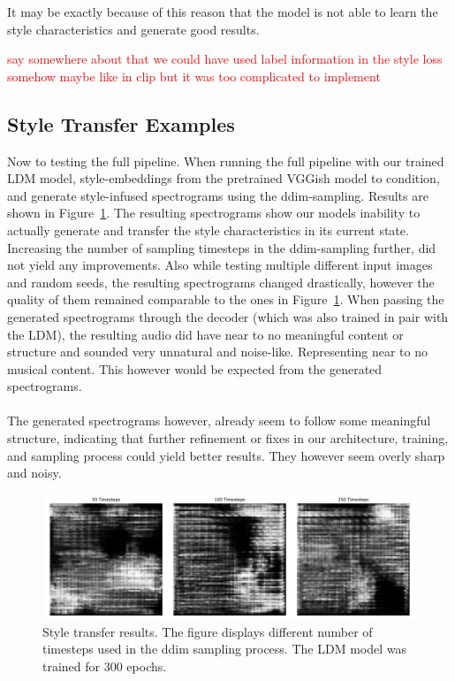 \noindent It may be exactly because of this reason that the model is not able to learn the style characteristics and generate good results.

\textcolor{red}{say somewhere about that we could have used label information in the style loss somehow maybe like in clip but it was too complicated to implement}

\subsection{Style Transfer Examples}
Now to testing the full pipeline.
When running the full pipeline with our trained LDM model, style-embeddings from the pretrained VGGish model to condition, and generate 
style-infused spectrograms using the ddim-sampling. Results are shown in Figure~\ref{fig:style_transfer_results}. 
The resulting spectrograms show our models inability to actually generate and transfer the style characteristics in its current state.
Increasing the number of sampling timesteps in the ddim-sampling further, did not yield any improvements.
Also while testing multiple different input images and random seeds, the resulting spectrograms changed drastically, 
however the quality of them remained comparable to the ones in Figure~\ref{fig:style_transfer_results}.
When passing the generated spectrograms through the decoder (which was also trained in pair with the LDM), 
the resulting audio did have near to no meaningful content or structure and sounded very unnatural and noise-like.
Representing near to no musical content. This however would be expected from the generated spectrograms.
\\\\
The generated spectrograms however, already seem to follow some meaningful structure, indicating that further refinement or fixes in our 
architecture, training, and sampling  process could yield better results. They however seem overly sharp and noisy.

\begin{figure}[h]
    \centering
    \includegraphics[width=\textwidth]{figures/test_ddimgen_ldm300epochs_generated_mel_spectrograms_comparison.png}
    \caption{Style transfer results. The figure displays different number of timesteps used in the ddim sampling process. 
    The LDM model was trained for 300 epochs.}
    \label{fig:style_transfer_results}
\end{figure}



